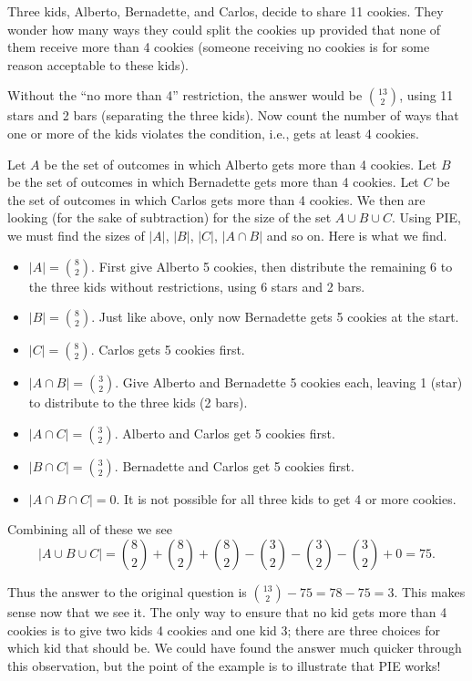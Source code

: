 \documentclass[12pt]{article}
\begin{document}
\begin{example}
Three kids, Alberto, Bernadette, and Carlos, decide to share 11 cookies.  They wonder how many ways they could split the cookies up provided that none of them receive more than 4 cookies (someone receiving no cookies is for some reason acceptable to these kids).

\begin{solution}
Without the ``no more than 4'' restriction, the answer would be ${13 \choose 2}$, using 11 stars and 2 bars (separating the three kids).  Now count the number of ways that one or more of the kids violates the condition, i.e., gets at least 4 cookies.

Let $A$ be the set of outcomes in which Alberto gets more than 4 cookies.  Let $B$ be the set of outcomes in which Bernadette gets more than 4 cookies.  Let $C$ be the set of outcomes in which Carlos gets more than 4 cookies.  We then are looking (for the sake of subtraction) for the size of the set $A \cup B \cup C$.  Using PIE, we must find the sizes of $|A|$, $|B|$, $|C|$, $|A\cap B|$ and so on.  Here is what we find.

\begin{itemize}
\item[] $|A| = {8 \choose 2}$.  First give Alberto 5 cookies, then distribute the remaining 6 to the three kids without restrictions, using 6 stars and 2 bars.
\item[] $|B| = {8 \choose 2}$.  Just like above, only now Bernadette gets 5 cookies at the start.
\item[] $|C| = {8 \choose 2}$.  Carlos gets 5 cookies first.

\item[] $|A \cap B| = {3 \choose 2}$.  Give Alberto and Bernadette 5 cookies each, leaving 1 (star) to distribute to the three kids (2 bars).

\item[] $|A \cap C| = {3 \choose 2}$.  Alberto and Carlos get 5 cookies first.  

\item[] $|B \cap C| = {3 \choose 2}$.  Bernadette and Carlos get 5 cookies first.

\item[] $|A \cap B \cap C| = 0$.  It is not possible for all three kids to get 4 or more cookies.
\end{itemize}

Combining all of these we see
\[|A \cup B \cup C| = {8 \choose 2} + {8 \choose 2} + {8 \choose 2} - {3 \choose 2} - {3 \choose 2} - {3 \choose 2} + 0 = 75.\]

Thus the answer to the original question is ${13 \choose 2} - 75 = 78 - 75 = 3$.  This makes sense now that we see it.  The only way to ensure that no kid gets more than 4 cookies is to give two kids 4 cookies and one kid 3; there are three choices for which kid that should be.  We could have found the answer much quicker through this observation, but the point of the example is to illustrate that PIE works!
\end{solution}
\end{example}
\end{document}
